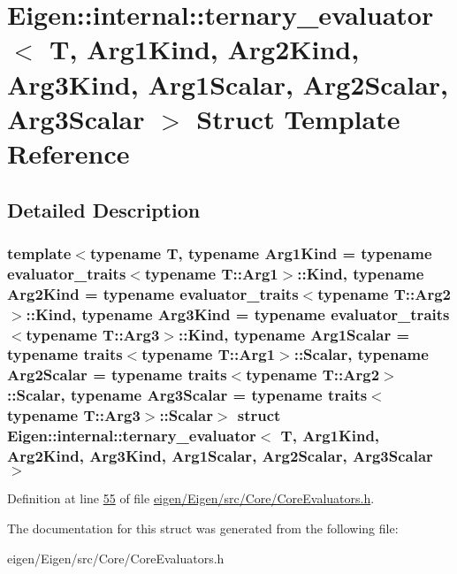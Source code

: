 \hypertarget{struct_eigen_1_1internal_1_1ternary__evaluator}{}\section{Eigen\+:\+:internal\+:\+:ternary\+\_\+evaluator$<$ T, Arg1\+Kind, Arg2\+Kind, Arg3\+Kind, Arg1\+Scalar, Arg2\+Scalar, Arg3\+Scalar $>$ Struct Template Reference}
\label{struct_eigen_1_1internal_1_1ternary__evaluator}


\subsection{Detailed Description}
\subsubsection*{template$<$typename T, typename Arg1\+Kind = typename evaluator\+\_\+traits$<$typename T\+::\+Arg1$>$\+::\+Kind, typename Arg2\+Kind = typename evaluator\+\_\+traits$<$typename T\+::\+Arg2$>$\+::\+Kind, typename Arg3\+Kind = typename evaluator\+\_\+traits$<$typename T\+::\+Arg3$>$\+::\+Kind, typename Arg1\+Scalar = typename traits$<$typename T\+::\+Arg1$>$\+::\+Scalar, typename Arg2\+Scalar = typename traits$<$typename T\+::\+Arg2$>$\+::\+Scalar, typename Arg3\+Scalar = typename traits$<$typename T\+::\+Arg3$>$\+::\+Scalar$>$\newline
struct Eigen\+::internal\+::ternary\+\_\+evaluator$<$ T, Arg1\+Kind, Arg2\+Kind, Arg3\+Kind, Arg1\+Scalar, Arg2\+Scalar, Arg3\+Scalar $>$}



Definition at line \hyperlink{eigen_2_eigen_2src_2_core_2_core_evaluators_8h_source_l00055}{55} of file \hyperlink{eigen_2_eigen_2src_2_core_2_core_evaluators_8h_source}{eigen/\+Eigen/src/\+Core/\+Core\+Evaluators.\+h}.



The documentation for this struct was generated from the following file\+:\begin{DoxyCompactItemize}
\item 
eigen/\+Eigen/src/\+Core/\+Core\+Evaluators.\+h\end{DoxyCompactItemize}
